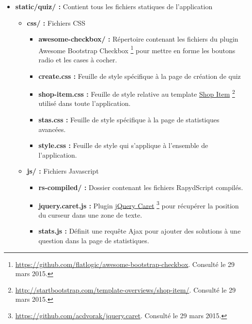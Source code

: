 \documentclass[a4,10pt,french]{sphinxmanual}
\begin{document}
\begin{itemize}
\begin{itemize}
\end{itemize}

\item {} 
\textbf{static/quiz/ :} Contient tous les fichiers statiques de l'application
\begin{itemize}
\item {} 
\textbf{css/ :} Fichiers CSS
\begin{itemize}
\item {} 
\textbf{awesome-checkbox/ :} Répertoire contenant les fichiers du plugin Awesome Bootstrap Checkbox \footnote{
\href{https://github.com/flatlogic/awesome-bootstrap-checkbox}{https://github.com/flatlogic/awesome-bootstrap-checkbox}. Consulté le 29 mars 2015.
} pour mettre en forme les boutons radio et les cases à cocher.

\item {} 
\textbf{create.css :} Feuille de style spécifique à la page de création de quiz

\item {} 
\textbf{shop-item.css :} Feuille de style relative au template \href{http://startbootstrap.com/template-overviews/shop-item/}{Shop Item} \footnote{
\href{http://startbootstrap.com/template-overviews/shop-item/}{http://startbootstrap.com/template-overviews/shop-item/}. Consulté le 29 mars 2015.
} utilisé dans toute l'application.

\item {} 
\textbf{stas.css :} Feuille de style spécifique à la page de statistiques avancées.

\item {} 
\textbf{style.css :} Feuille de style qui s'applique à l'ensemble de l'application.

\end{itemize}

\item {} 
\textbf{js/ :} Fichiers Javascript
\begin{itemize}
\item {} 
\textbf{rs-compiled/ :} Dossier contenant les fichiers RapydScript compilés.

\item {} 
\textbf{jquery.caret.js :} Plugin \href{https://github.com/acdvorak/jquery.caret}{jQuery Caret} \footnote{
\href{https://github.com/acdvorak/jquery.caret}{https://github.com/acdvorak/jquery.caret}. Consulté le 29 mars 2015.
} pour récupérer la position du curseur dans une zone de texte.

\item {} 
\textbf{stats.js :} Définit une requête Ajax pour ajouter des solutions à une question dans la page de statistiques.


\end{itemize}
\end{itemize}
\end{itemize}
\end{document}
